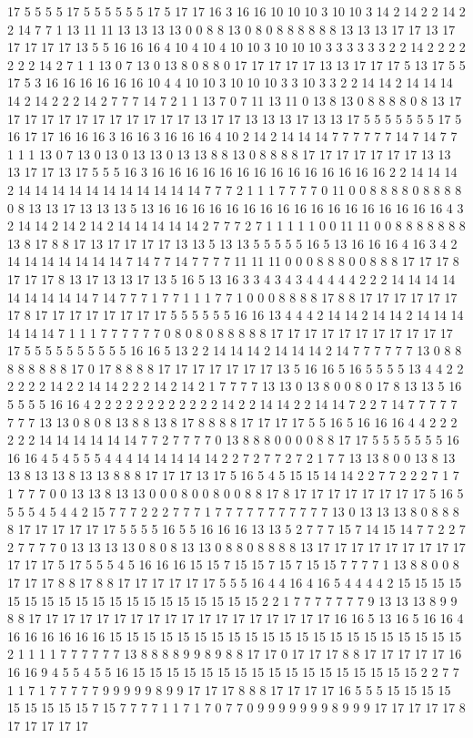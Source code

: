 17 5 5 5 5 17 5 5 5 5 5 5 17 5 17 17 16 3 16 16 10 10 10 3 10 10 3 14 2 14 2 2 14 2 2 14 7 7 1 13 11 11 13 13 13 13 0 0 8 8 13 0 8 0 8 8 8 8 8 8 13 13 13 17 17 13 17 17 17 17 17 13 5 5 16 16 16 4 10 4 10 4 10 10 3 10 10 10 3 3 3 3 3 3 2 2 14 2 2 2 2 2 2 2 14 2 7 1 1 13 0 7 13 0 13 8 0 8 8 0 17 17 17 17 17 13 13 17 17 17 5 13 17 5 5 17 5 3 16 16 16 16 16 16 10 4 4 10 10 3 10 10 10 3 3 10 3 3 2 2 14 14 2 14 14 14 14 2 14 2 2 2 14 2 7 7 7 14 7 2 1 1 13 7 0 7 11 13 11 0 13 8 13 0 8 8 8 8 0 8 13 17 17 17 17 17 17 17 17 17 17 17 17 13 17 17 13 13 13 17 13 13 17 5 5 5 5 5 5 5 17 5 16 17 17 16 16 16 3 16 16 3 16 16 16 4 10 2 14 2 14 14 14 7 7 7 7 7 7 14 7 14 7 7 1 1 1 13 0 7 13 0 13 0 13 13 0 13 13 8 8 13 0 8 8 8 8 17 17 17 17 17 17 17 13 13 13 17 17 13 17 5 5 5 16 3 16 16 16 16 16 16 16 16 16 16 16 16 16 16 2 2 14 14 14 2 14 14 14 14 14 14 14 14 14 14 14 7 7 7 2 1 1 1 7 7 7 7 0 11 0 0 8 8 8 8 0 8 8 8 8 0 8 13 13 17 13 13 13 5 13 16 16 16 16 16 16 16 16 16 16 16 16 16 16 16 16 16 4 3 2 14 14 2 14 2 14 2 14 14 14 14 14 2 7 7 7 2 7 1 1 1 1 1 0 0 11 11 0 0 8 8 8 8 8 8 8 13 8 17 8 8 17 13 17 17 17 17 13 13 5 13 13 5 5 5 5 5 16 5 13 16 16 16 4 16 3 4 2 14 14 14 14 14 14 14 7 14 7 7 14 7 7 7 7 11 11 11 0 0 0 8 8 8 0 0 8 8 8 17 17 17 8 17 17 17 8 13 17 13 13 17 13 5 16 5 13 16 3 3 4 3 4 3 4 4 4 4 4 2 2 2 14 14 14 14 14 14 14 14 14 7 14 7 7 7 1 7 7 1 1 1 7 7 1 0 0 0 8 8 8 8 17 8 8 17 17 17 17 17 17 17 8 17 17 17 17 17 17 17 17 5 5 5 5 5 5 16 16 13 4 4 4 2 14 14 2 14 14 2 14 14 14 14 14 14 7 1 1 1 7 7 7 7 7 7 0 8 0 8 0 8 8 8 8 8 17 17 17 17 17 17 17 17 17 17 17 17 5 5 5 5 5 5 5 5 5 5 16 16 5 13 2 2 14 14 14 2 14 14 14 2 14 7 7 7 7 7 7 13 0 8 8 8 8 8 8 8 8 17 0 17 8 8 8 8 17 17 17 17 17 17 17 13 5 16 16 5 16 5 5 5 5 13 4 4 2 2 2 2 2 2 14 2 2 14 14 2 2 2 14 2 14 2 1 7 7 7 7 13 13 0 13 8 0 0 8 0 17 8 13 13 5 16 5 5 5 5 16 16 4 2 2 2 2 2 2 2 2 2 2 2 2 14 2 2 14 14 2 2 14 14 7 2 2 7 14 7 7 7 7 7 7 7 7 13 13 0 8 0 8 13 8 8 13 8 17 8 8 8 8 17 17 17 17 5 5 16 5 16 16 16 4 4 2 2 2 2 2 2 14 14 14 14 14 14 7 7 2 7 7 7 7 0 13 8 8 8 0 0 0 0 8 8 17 17 5 5 5 5 5 5 5 16 16 16 4 5 4 5 5 5 4 4 4 14 14 14 14 14 2 2 7 2 7 7 2 7 2 1 7 7 13 13 8 0 0 13 8 13 13 8 13 13 8 13 13 8 8 8 17 17 17 13 17 5 16 5 4 5 15 15 14 14 2 2 7 7 2 2 2 7 1 7 1 7 7 7 0 0 13 13 8 13 13 0 0 0 8 0 0 8 0 0 8 8 17 8 17 17 17 17 17 17 17 17 5 16 5 5 5 5 4 5 4 4 2 15 7 7 7 2 2 2 7 7 7 1 7 7 7 7 7 7 7 7 7 7 7 13 0 13 13 13 8 0 8 8 8 8 17 17 17 17 17 17 5 5 5 5 16 5 5 16 16 16 13 13 5 2 7 7 7 15 7 14 15 14 7 7 2 2 7 2 7 7 7 7 0 13 13 13 13 0 8 0 8 13 13 0 8 8 0 8 8 8 8 13 17 17 17 17 17 17 17 17 17 17 17 17 5 17 5 5 5 4 5 16 16 16 15 15 7 15 15 7 15 7 15 15 7 7 7 7 1 13 8 8 0 0 8 17 17 17 8 8 17 8 8 17 17 17 17 17 17 5 5 5 16 4 4 16 4 16 5 4 4 4 4 2 15 15 15 15 15 15 15 15 15 15 15 15 15 15 15 15 15 15 15 2 2 1 7 7 7 7 7 7 7 9 13 13 13 8 9 9 8 8 17 17 17 17 17 17 17 17 17 17 17 17 17 17 17 17 17 17 16 16 5 13 16 5 16 16 4 16 16 16 16 16 16 15 15 15 15 15 15 15 15 15 15 15 15 15 15 15 15 15 15 15 15 15 2 1 1 1 1 7 7 7 7 7 7 13 8 8 8 8 9 9 8 9 8 8 17 17 0 17 17 17 8 8 17 17 17 17 17 16 16 16 9 4 5 5 4 5 5 16 15 15 15 15 15 15 15 15 15 15 15 15 15 15 15 15 15 2 2 7 7 1 1 7 1 7 7 7 7 7 9 9 9 9 9 8 9 9 17 17 17 8 8 8 17 17 17 17 16 5 5 5 15 15 15 15 15 15 15 15 15 7 15 7 7 7 7 1 1 7 1 7 0 7 7 0 9 9 9 9 9 9 9 8 9 9 9 17 17 17 17 17 8 17 17 17 17 17 